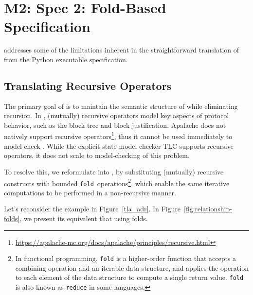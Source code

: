 
\section{M2: Spec 2: Fold-Based Specification}

\SpecTwo{} addresses some of the limitations inherent in the straightforward
translation of \SpecOne{} from the Python executable specification.

\subsection{Translating Recursive \tlap{} Operators}

The primary goal of \SpecTwo{} is to maintain the semantic structure of
\SpecOne{} while eliminating recursion. In \SpecOne{}, (mutually) recursive
operators model key aspects of protocol behavior, such as the block tree and
block justification. Apalache does not natively support recursive
operators\footnote{\url{https://apalache-mc.org/docs/apalache/principles/recursive.html}},
thus it cannot be used immediately to model-check \SpecOne{}. While the
explicit-state \tlap{} model checker TLC supports recursive operators, it does
not scale to model-checking of this problem.

To resolve this, we reformulate \SpecOne{} into \SpecTwo{}, by substituting
(mutually) recursive constructs with bounded
\texttt{fold}~operations\footnote{In functional programming, \texttt{fold} is a
higher-order function that accepts a combining operation and an iterable data
structure, and applies the operation to each element of the data structure
to compute a single return value. \texttt{fold} is also known as
\texttt{reduce} in some languages.}, which enable the same iterative
computations to be performed in a non-recursive manner.

Let's reconsider the example in Figure~\ref{tla_adr}. In
Figure~\ref{fig:relationship-folds}, we present its equivalent that using
folds.

